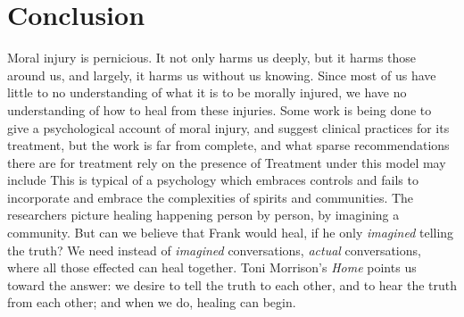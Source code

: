 \documentclass[12pt]{article}
\begin{document}

\section{Conclusion}

Moral injury is pernicious. It not only harms us deeply, but it harms those
around us, and largely, it harms us without us knowing. Since most of us have
little to no understanding of what it is to be morally injured, we have no
understanding of how to heal from these injuries. Some work is being done to
give a psychological account of moral injury, and suggest clinical practices
for its treatment,\autocite{psych} but the work is far from complete, and what
sparse recommendations there are for treatment rely on the presence of
\autocite[\S 7.2]{psych} Treatment under this
model may include \autocite[\S 7.2.5]{psych} This is typical of a psychology
which embraces controls and fails to incorporate and embrace the complexities
of spirits and communities. The researchers picture healing happening person by
person, by imagining a community. But can we believe that Frank would heal, if
he only \emph{imagined} telling the truth? We need instead of \emph{imagined}
conversations, \emph{actual} conversations, where all those effected can heal
together. Toni Morrison's \emph{Home} points us toward the answer: we desire to
tell the truth to each other, and to hear the truth from each other; and when
we do, healing can begin.


\end{document}
